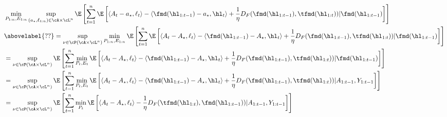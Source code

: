 \begin{align*}
     & \min_{P_{1:n}, E_{1:n}}
    \sup_{(a_\star, \ell_{1:n}) \in \cA \times \cL^n}
    \E\left[
        \sum_{t=1}^{n}
        \E\left[
            \langle A_t - a_\star, \ell_t\rangle
            - \langle \fmd(\hl_{1:t-1}) - a_\star, \hl_t\rangle
            + \frac{1}{\eta} D_F(\fmd(\hl_{1:t-1}), \tfmd(\hl_{1:t}))
            | \fmd(\hl_{1:t-1})
            \right]
    \right]                    \\
     & \abovelabel{??} =
    \sup_{\nu \in \cP(\cA \times \cL^n)}
    \min_{P_{1:n}, E_{1:n}}
    \E\left[
        \sum_{t=1}^{n}
        \E\left[
            \langle A_t - A_\star, \ell_t\rangle
            - \langle \fmd(\hl_{1:t-1}) - A_\star, \hl_t\rangle
            + \frac{1}{\eta} D_F(\fmd(\hl_{1:t-1}), \tfmd(\hl_{1:t}))
            | \fmd(\hl_{1:t-1})
            \right]
    \right]                    \\
     & =
    \sup_{\nu \in \cP(\cA \times \cL^n)}
    \E\left[
        \sum_{t=1}^{n}
        \min_{P_t, E_t}
        \E\left[
            \langle A_t - A_\star, \ell_t\rangle
            - \langle \fmd(\hl_{1:t-1}) - A_\star, \hl_t\rangle
            + \frac{1}{\eta} D_F(\fmd(\hl_{1:t-1}), \tfmd(\hl_{1:t}))
            | \fmd(\hl_{1:t-1})
            \right]
    \right]                    \\
     & =
    \sup_{\nu \in \cP(\cA \times \cL^n)}
    \E\left[
        \sum_{t=1}^{n}
        \min_{P_t, E_t}
        \E\left[
            \langle A_t - A_\star, \ell_t\rangle
            - \langle \fmd(\hl_{1:t-1}) - A_\star, \hl_t\rangle
            + \frac{1}{\eta} D_F(\fmd(\hl_{1:t-1}), \tfmd(\hl_{1:t}))
            | A_{1:t-1}, Y_{1:t-1}
            \right]
    \right]                    \\
     & =
    \sup_{\nu \in \cP(\cA \times \cL^n)}
    \E\left[
        \sum_{t=1}^{n}
        \min_{P_t}
        \E\left[
            \langle A_t - A_\star, \ell_t\rangle
            -
            \frac{1}{\eta} D_F(\tfmd(\hl_{1:t}), \fmd(\hl_{1:t-1}))
            | A_{1:t-1}, Y_{1:t-1}
            \right]
    \right]                    \\
\end{align*}





\clearpage

